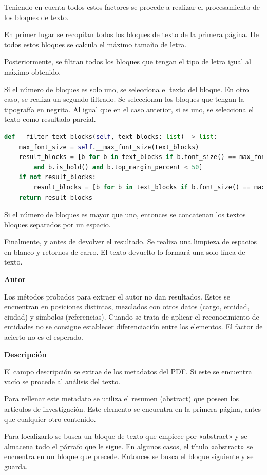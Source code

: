 \documentclass[../main.tex]{subfiles}
\begin{document}
Teniendo en cuenta todos estos factores se procede a realizar el procesamiento de los bloques de texto.

En primer lugar se recopilan todos los bloques de texto de la primera página. De todos estos bloques se calcula el máximo tamaño de letra.

Posteriormente, se filtran todos los bloques que tengan el tipo de letra igual al máximo obtenido.


Si el número de bloques es solo uno, se selecciona el texto del bloque. En otro caso, se realiza un segundo filtrado. Se seleccionan los bloques que tengan la tipografía en negrita. Al igual que en el caso anterior, si es uno, se selecciona el texto como resultado parcial.

\begin{lstlisting}[language=Python]
def __filter_text_blocks(self, text_blocks: list) -> list:
    max_font_size = self.__max_font_size(text_blocks)
    result_blocks = [b for b in text_blocks if b.font_size() == max_font_size
        and b.is_bold() and b.top_margin_percent < 50]
    if not result_blocks:
        result_blocks = [b for b in text_blocks if b.font_size() == max_font_size]
    return result_blocks
\end{lstlisting}

Si el número de bloques es mayor que uno, entonces se concatenan los textos bloques separados por un espacio.

Finalmente, y antes de devolver el resultado. Se realiza una limpieza de espacios en blanco y retornos de carro. El texto devuelto lo formará una solo línea de texto.

\textbf{Autor}

Los métodos probados para extraer el autor no dan resultados. Estos se encuentran en posiciones distintas, mezclados con otros datos (cargo, entidad, ciudad) y símbolos (referencias). Cuando se trata de aplicar el reconocimiento de entidades no se consigue establecer diferenciación entre los elementos. El factor de acierto no es el esperado.

\textbf{Descripción}

El campo descripción se extrae de los metadatos del PDF. Si este se encuentra vacío se procede al análisis del texto.

Para rellenar este metadato se utiliza el resumen (abstract) que poseen  los artículos de investigación. Este elemento se encuentra en la primera página, antes que cualquier otro contenido.

Para localizarlo se busca un bloque de texto que empiece por «abstract» y se almacena todo el párrafo que le sigue. En algunos casos, el título «abstract» se encuentra en un bloque que precede. Entonces se busca el bloque siguiente y se guarda.
\end{document}
